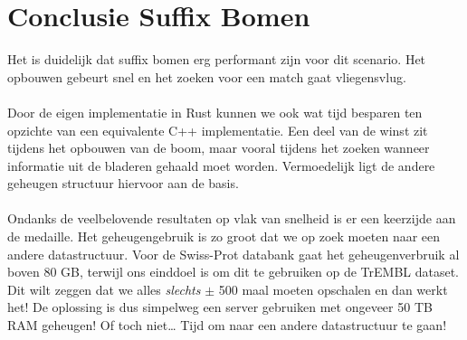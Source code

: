 \section{Conclusie Suffix Bomen}\label{sec:conclusie-suffix-bomen}
Het is duidelijk dat suffix bomen erg performant zijn voor dit scenario.
Het opbouwen gebeurt snel en het zoeken voor een match gaat vliegensvlug.
\\ \\
Door de eigen implementatie in Rust kunnen we ook wat tijd besparen ten opzichte van een equivalente C++ implementatie.
Een deel van de winst zit tijdens het opbouwen van de boom, maar vooral tijdens het zoeken wanneer informatie uit de bladeren gehaald moet worden.
Vermoedelijk ligt de andere geheugen structuur hiervoor aan de basis.
\\ \\
Ondanks de veelbelovende resultaten op vlak van snelheid is er een keerzijde aan de medaille.
Het geheugengebruik is zo groot dat we op zoek moeten naar een andere datastructuur.
Voor de Swiss-Prot databank gaat het geheugenverbruik al boven 80 GB, terwijl ons einddoel is om dit te gebruiken op de TrEMBL dataset.
Dit wilt zeggen dat we alles \textit{slechts} $\pm$ 500 maal moeten opschalen en dan werkt het!
De oplossing is dus simpelweg een server gebruiken met ongeveer 50 TB RAM geheugen!
Of toch niet\ldots
Tijd om naar een andere datastructuur te gaan!
